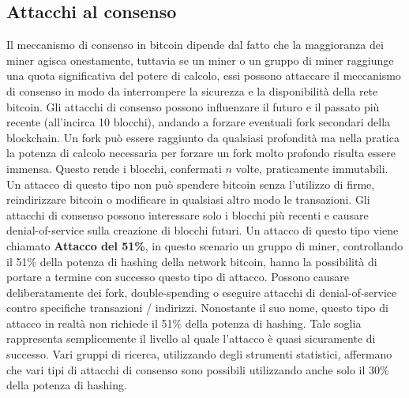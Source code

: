 \subsection{Attacchi al consenso}
Il meccanismo di consenso in bitcoin dipende dal fatto che la maggioranza dei miner agisca onestamente, tuttavia se un miner o un gruppo di miner raggiunge una quota significativa del potere di calcolo, essi possono attaccare il meccanismo di consenso in modo da interrompere la sicurezza e la disponibilità della rete bitcoin. Gli attacchi di consenso possono influenzare il futuro e il passato più recente (all'incirca 10 blocchi), andando a forzare eventuali fork secondari della blockchain. Un fork può essere raggiunto da qualsiasi profondità ma nella pratica la potenza di calcolo necessaria per forzare un fork molto profondo risulta essere immensa. Questo rende i blocchi, confermati $n$ volte, praticamente immutabili. Un attacco di questo tipo non può spendere bitcoin senza l'utilizzo di firme, reindirizzare bitcoin o modificare in qualsiasi altro modo le transazioni. Gli attacchi di consenso possono interessare solo i blocchi più recenti e causare denial-of-service sulla creazione di blocchi futuri. Un attacco di questo tipo viene chiamato \textbf{Attacco del 51\%}, in questo scenario un gruppo di miner, controllando il 51\% della potenza di hashing della network bitcoin, hanno la possibilità di portare a termine con successo questo tipo di attacco. Possono causare deliberatamente dei fork, double-spending o eseguire attacchi di denial-of-service contro specifiche transazioni / indirizzi. Nonostante il suo nome, questo tipo di attacco in realtà non richiede il 51\% della potenza di hashing. Tale soglia rappresenta semplicemente il livello al quale l'attacco è quasi sicuramente di successo. Vari gruppi di ricerca, utilizzando degli strumenti statistici, affermano che vari tipi di attacchi di consenso sono possibili utilizzando anche solo il 30\% della potenza di hashing.

